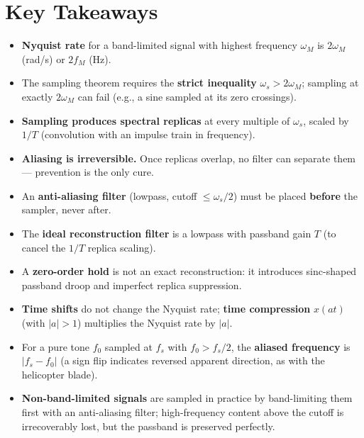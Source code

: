 \documentclass[11pt]{article}
\begin{document}
\section*{Key Takeaways}

\begin{itemize}[leftmargin=*]
    \item \textbf{Nyquist rate} for a band-limited signal with highest frequency $\omega_M$ is $2\omega_M$ (rad/s) or $2f_M$ (Hz).
    \item The sampling theorem requires the \textbf{strict inequality} $\omega_s > 2\omega_M$; sampling at exactly $2\omega_M$ can fail (e.g., a sine sampled at its zero crossings).
    \item \textbf{Sampling produces spectral replicas} at every multiple of $\omega_s$, scaled by $1/T$ (convolution with an impulse train in frequency).
    \item \textbf{Aliasing is irreversible.} Once replicas overlap, no filter can separate them --- prevention is the only cure.
    \item An \textbf{anti-aliasing filter} (lowpass, cutoff $\le \omega_s/2$) must be placed \textbf{before} the sampler, never after.
    \item The \textbf{ideal reconstruction filter} is a lowpass with passband gain $T$ (to cancel the $1/T$ replica scaling).
    \item A \textbf{zero-order hold} is not an exact reconstruction: it introduces sinc-shaped passband droop and imperfect replica suppression.
    \item \textbf{Time shifts} do not change the Nyquist rate; \textbf{time compression} $x(at)$ (with $|a|>1$) multiplies the Nyquist rate by $|a|$.
    \item For a pure tone $f_0$ sampled at $f_s$ with $f_0 > f_s/2$, the \textbf{aliased frequency} is $|f_s - f_0|$ (a sign flip indicates reversed apparent direction, as with the helicopter blade).
    \item \textbf{Non-band-limited signals} are sampled in practice by band-limiting them first with an anti-aliasing filter; high-frequency content above the cutoff is irrecoverably lost, but the passband is preserved perfectly.
\end{itemize}
\end{document}
